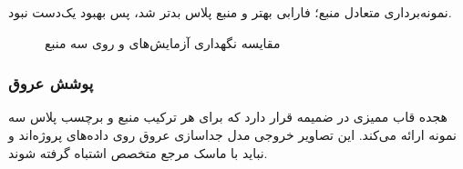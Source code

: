 نمونه‌برداری متعادل منبع؛ فارابی بهتر و منبع پلاس بدتر شد، پس بهبود یک‌دست نبود.

\begin{figure}[htbp]
  \centering
  \caption{مقایسه نگهداری آزمایش‌های  و  روی سه منبع}
\end{figure}

\subsubsection{پوشش عروق}

هجده قاب ممیزی در ضمیمه قرار دارد که برای هر ترکیب منبع و برچسب پلاس سه نمونه ارائه می‌کند. این تصاویر خروجی مدل جداسازی عروق روی داده‌های پروژه‌اند و نباید با ماسک مرجع متخصص اشتباه گرفته شوند.
